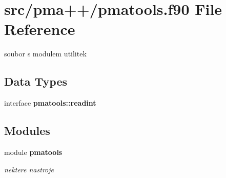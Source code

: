 \section{src/pma++/pmatools.f90 File Reference}
\label{pmatools_8f90}


soubor s modulem utilitek  


\subsection*{Data Types}
\begin{DoxyCompactItemize}
\item 
interface {\bf pmatools\+::readint}
\end{DoxyCompactItemize}
\subsection*{Modules}
\begin{DoxyCompactItemize}
\item 
module {\bf pmatools}
\begin{DoxyCompactList}\small\item\em nektere nastroje \end{DoxyCompactList}\end{DoxyCompactItemize}
